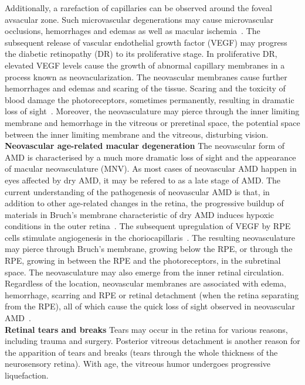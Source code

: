 \documentclass[12pt,a4paper]{journal}
\begin{document}
Additionally, a rarefaction of capillaries can be observed around the foveal avsacular zone.
Such microvascular degenerations may cause microvascular occlusions, hemorrhages and edemas as well as macular ischemia~\cite{Medina_2016}.
The subsequent release of vascular endothelial growth factor (VEGF) may progress the diabetic retinopathy (DR) to its proliferative stage.
In proliferative DR, elevated VEGF levels cause the growth of abnormal capillary membranes in a process known as neovacularization.
The neovascular membranes cause further hemorrhages and edemas and scaring of the tissue.
Scaring and the toxicity of blood damage the photoreceptors, sometimes permanently, resulting in dramatic loss of sight~\cite{Friedlander_2007,Gupta_2015}.
Moreover, the neovasculature may pierce through the inner limiting membrane and hemorrhage in the vitreous or preretinal space, the potential space between the inner limiting membrane and the vitreous, disturbing vision.\\
\textbf{Neovascular age-related macular degeneration}
The neovascular form of AMD is characterised by a much more dramatic loss of sight and the appearance of macular neovasculature (MNV).
As most cases of neovascular AMD happen in eyes affected by dry AMD, it may be refered to as a late stage of AMD.
The current understanding of the pathogenesis of neovascular AMD is that, in addition to other age-related changes in the retina, the progressive buildup of materials in Bruch's membrane characteristic of dry AMD induces hypoxic conditions in the outer retina~\cite{Jager_2008,Newsom_2008}.
The subsequent upregulation of VEGF by RPE cells stimulate angiogenesis in the choriocapillaris~\cite{Jager_2008}.
The resulting neovasculature may pierce through Bruch's membrane, growing below the RPE, or through the RPE, growing in between the RPE and the photoreceptors, in the subretinal space.
The neovasculature may also emerge from the inner retinal circulation.
Regardless of the location, neovascular membranes are associated with edema, hemorrhage, scarring and RPE or retinal detachment (when the retina separating from the RPE), all of which cause the quick loss of sight observed in neovascular AMD~\cite{Gupta_2015,Jager_2008}.\\
\textbf{Retinal tears and breaks}
Tears may occur in the retina for various reasons, including trauma and surgery.
Posterior vitreous detachment is another reason for the apparition of tears and breaks (tears through the whole thickness of the neurosensory retina).
With age, the vitreous humor undergoes progressive liquefaction.
\end{document}
